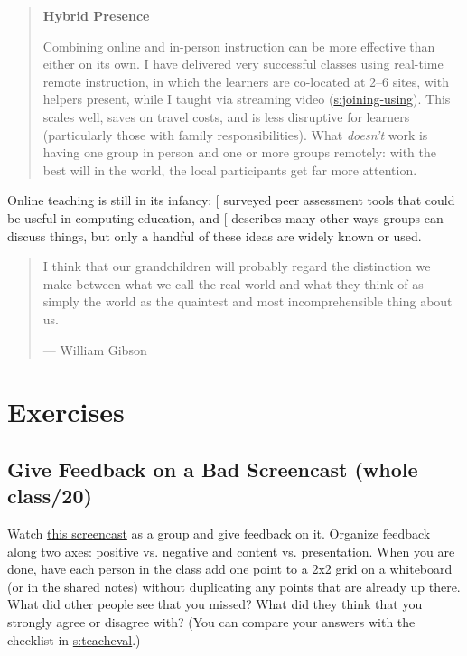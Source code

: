 \begin{quote}\setlength{\parindent}{0pt}
\textbf{Hybrid Presence}

Combining online and in-person instruction can be more effective than
either on its own. I have delivered very successful classes using
real-time remote instruction, in which the learners are co-located at
2--6 sites, with helpers present, while I taught via streaming video
(\protect\hyperlink{SECTION}{s:joining-using}). This scales well, saves on travel
costs, and is less disruptive for learners (particularly those with
family responsibilities). What \emph{doesn't} work is having one group in
person and one or more groups remotely: with the best will in the
world, the local participants get far more attention.
\end{quote}

Online teaching is still in its infancy: {[}\protect[\hyperlink{b:Luxt2009}{Luxt2009}]{]} surveyed
peer assessment tools that could be useful in computing education, and
{[}\protect[\hyperlink{b:Broo2016}{Broo2016}]{]} describes many other ways groups can discuss things,
but only a handful of these ideas are widely known or used.

\begin{quote}\setlength{\parindent}{0pt}
I think that our grandchildren will probably regard the distinction we
make between what we call the real world and what they think of as
simply the world as the quaintest and most incomprehensible thing
about us.

--- William Gibson
\end{quote}

\section{Exercises}\label{s:online-exercises}

\subsection{Give Feedback on a Bad Screencast (whole class/20)}\label{give-feedback-on-a-bad-screencast-whole-class20}

Watch \href{https://youtu.be/xcnoHaxXvdQ}{this screencast} as a group and give
feedback on it. Organize feedback along two axes: positive
vs. negative and content vs. presentation. When you are done, have
each person in the class add one point to a 2x2 grid on a whiteboard
(or in the shared notes) without duplicating any points that are
already up there. What did other people see that you missed? What did
they think that you strongly agree or disagree with? (You can compare
your answers with the checklist in \protect\hyperlink{APPENDIX}{s:teacheval}.)

